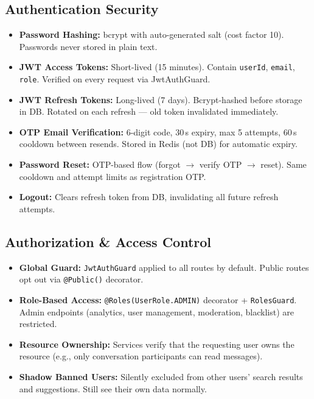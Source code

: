 \documentclass[a4paper,11pt]{article}
\begin{document}
\subsection{Authentication Security}

\begin{itemize}[leftmargin=1.5em]
    \item \textbf{Password Hashing:} bcrypt with auto-generated salt (cost factor 10). Passwords never stored in plain text.
    \item \textbf{JWT Access Tokens:} Short-lived (15 minutes). Contain \texttt{userId}, \texttt{email}, \texttt{role}. Verified on every request via JwtAuthGuard.
    \item \textbf{JWT Refresh Tokens:} Long-lived (7 days). Bcrypt-hashed before storage in DB. Rotated on each refresh --- old token invalidated immediately.
    \item \textbf{OTP Email Verification:} 6-digit code, 30\,s expiry, max 5 attempts, 60\,s cooldown between resends. Stored in Redis (not DB) for automatic expiry.
    \item \textbf{Password Reset:} OTP-based flow (forgot $\to$ verify OTP $\to$ reset). Same cooldown and attempt limits as registration OTP.
    \item \textbf{Logout:} Clears refresh token from DB, invalidating all future refresh attempts.
\end{itemize}

\subsection{Authorization \& Access Control}

\begin{itemize}[leftmargin=1.5em]
    \item \textbf{Global Guard:} \texttt{JwtAuthGuard} applied to all routes by default. Public routes opt out via \texttt{@Public()} decorator.
    \item \textbf{Role-Based Access:} \texttt{@Roles(UserRole.ADMIN)} decorator + \texttt{RolesGuard}. Admin endpoints (analytics, user management, moderation, blacklist) are restricted.
    \item \textbf{Resource Ownership:} Services verify that the requesting user owns the resource (e.g., only conversation participants can read messages).
    \item \textbf{Shadow Banned Users:} Silently excluded from other users' search results and suggestions. Still see their own data normally.
\end{itemize}
\end{document}
